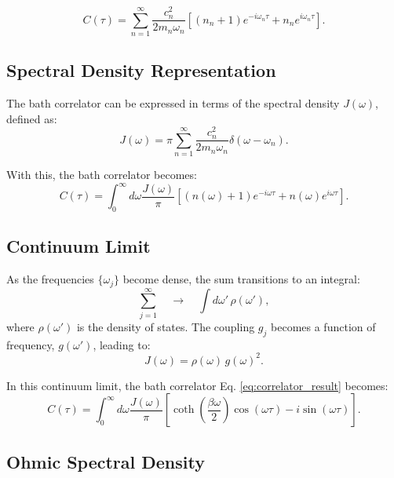 \begin{equation} \label{eq:correlator_result}
	C(\tau) = \sum_{n=1}^{\infty} \frac{c_n^2}{2 m_n \omega_n} \left[ (n_n + 1) e^{-i \omega_n \tau} + n_n e^{i \omega_n \tau} \right].
\end{equation}

\subsection{Spectral Density Representation}
\label{subsec:spectral_density}

The bath correlator can be expressed in terms of the spectral density \( J(\omega) \), defined as:
\begin{equation} \label{eq:bath_spectral_density}
	J(\omega) = \pi \sum_{n=1}^{\infty} \frac{c_n^2}{2 m_n \omega_n} \delta(\omega - \omega_n).
\end{equation}

With this, the bath correlator becomes:
\begin{equation} \label{eq:correlator_spectral_density}
	C(\tau) = \int_0^\infty d\omega \frac{J(\omega)}{\pi} \left[ (n(\omega) + 1) e^{-i \omega \tau} + n(\omega) e^{i \omega \tau} \right].
\end{equation}

\subsection{Continuum Limit}
As the frequencies \( \{\omega_j\} \) become dense, the sum transitions to an integral:
\[
	\sum_{j=1}^{\infty} \quad \longrightarrow \quad \int d\omega'\,\rho(\omega'),
\]
where \( \rho(\omega') \) is the density of states. The coupling \( g_j \) becomes a function of frequency, \( g(\omega') \), leading to:
\[
	J(\omega) = \rho(\omega)\,g(\omega)^2.
\]

In this continuum limit, the bath correlator Eq. \eqref{eq:correlator_result} becomes:
\begin{equation} \label{eq:correlator_final}
	C(\tau) = \int_0^\infty d\omega \frac{J(\omega)}{\pi} \left[ \coth\left( \frac{\beta \omega}{2} \right) \cos(\omega \tau) - i \sin(\omega \tau) \right].
\end{equation}

\subsection{Ohmic Spectral Density}
\label{subsec:ohmic_spectral_density}

